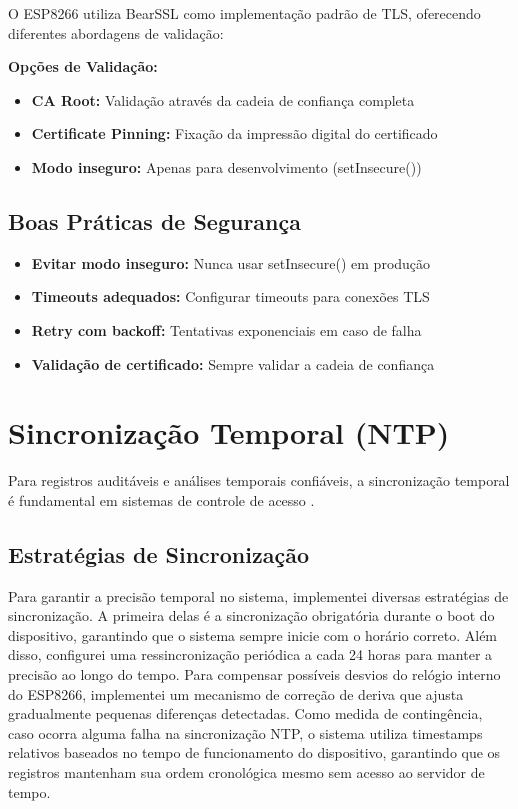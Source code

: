 O ESP8266 utiliza BearSSL como implementação padrão de TLS, oferecendo diferentes abordagens de validação:

\textbf{Opções de Validação:}
\begin{itemize}
\item \textbf{CA Root:} Validação através da cadeia de confiança completa
\item \textbf{Certificate Pinning:} Fixação da impressão digital do certificado
\item \textbf{Modo inseguro:} Apenas para desenvolvimento (setInsecure())
\end{itemize}

\subsection{Boas Práticas de Segurança}

\begin{itemize}
\item \textbf{Evitar modo inseguro:} Nunca usar setInsecure() em produção
\item \textbf{Timeouts adequados:} Configurar timeouts para conexões TLS
\item \textbf{Retry com backoff:} Tentativas exponenciais em caso de falha
\item \textbf{Validação de certificado:} Sempre validar a cadeia de confiança
\end{itemize}

\section{Sincronização Temporal (NTP)}
\label{sec:ntp-sync}

Para registros auditáveis e análises temporais confiáveis, a sincronização temporal é fundamental em sistemas de controle de acesso \cite{nic-br-ntp,observatorio-nacional}.

\subsection{Estratégias de Sincronização}

Para garantir a precisão temporal no sistema, implementei diversas estratégias de sincronização. A primeira delas é a sincronização obrigatória durante o boot do dispositivo, garantindo que o sistema sempre inicie com o horário correto. Além disso, configurei uma ressincronização periódica a cada 24 horas para manter a precisão ao longo do tempo. Para compensar possíveis desvios do relógio interno do ESP8266, implementei um mecanismo de correção de deriva que ajusta gradualmente pequenas diferenças detectadas. Como medida de contingência, caso ocorra alguma falha na sincronização NTP, o sistema utiliza timestamps relativos baseados no tempo de funcionamento do dispositivo, garantindo que os registros mantenham sua ordem cronológica mesmo sem acesso ao servidor de tempo.

